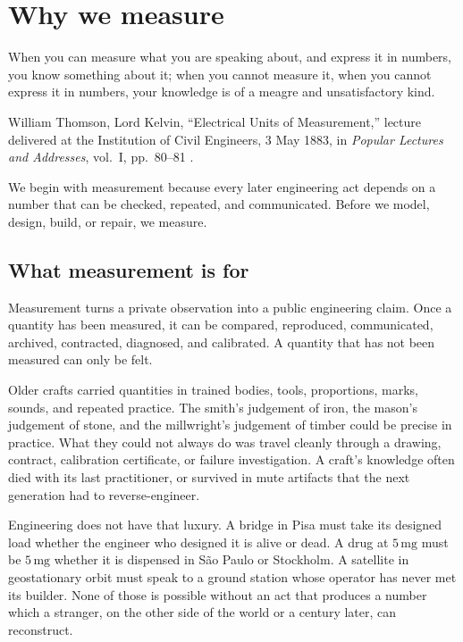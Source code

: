 \chapter{Why we measure}
\label{vol01:ch01}

\epigraph{When you can measure what you are speaking about, and express it
in numbers, you know something about it; when you cannot measure it, when
you cannot express it in numbers, your knowledge is of a meagre and
unsatisfactory kind.}{William Thomson, Lord Kelvin, ``Electrical Units of
Measurement,'' lecture delivered at the Institution of Civil Engineers,
3 May 1883, in \emph{Popular Lectures and Addresses}, vol.~I, pp.~80--81
\cite[pp.~80--81]{hist:kelvin1891}.}


\noindent
We begin with measurement because every later engineering act depends on
a number that can be checked, repeated, and communicated. Before we
model, design, build, or repair, we measure.

\section{What measurement is for}

Measurement turns a private observation into a public engineering claim.
Once a quantity has been measured, it can be compared, reproduced,
communicated, archived, contracted, diagnosed, and calibrated. A
quantity that has not been measured can only be felt.

Older crafts carried quantities in trained bodies, tools, proportions,
marks, sounds, and repeated practice. The smith's judgement of iron, the
mason's judgement of stone, and the millwright's judgement of timber
could be precise in practice. What they could not always do was travel
cleanly through a drawing, contract, calibration certificate, or failure
investigation. A craft's knowledge often died with its last practitioner,
or survived in mute artifacts that the next generation had to
reverse-engineer.

Engineering does not have that luxury. A bridge in Pisa must take its
designed load whether the engineer who designed it is alive or dead. A
drug at $5 \,\si{\milli\gram}$ must be $5 \,\si{\milli\gram}$ whether
it is dispensed in S\~ao Paulo or Stockholm. A satellite in geostationary
orbit must speak to a ground station whose operator has never met its
builder. None of those is possible without an act that produces a number
which a stranger, on the other side of the world or a century later,
can reconstruct.

